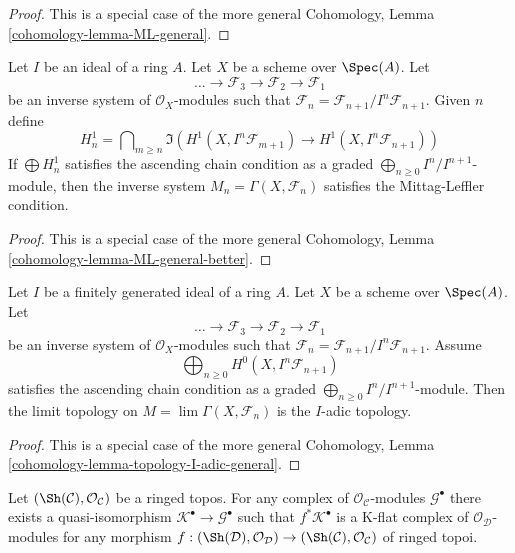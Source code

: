 \begin{proof}
This is a special case of the more general
Cohomology, Lemma \ref{cohomology-lemma-ML-general}.
\end{proof}

\begin{lemma}
\label{lemma-ML-general-better}
Let $I$ be an ideal of a ring $A$. Let $X$ be a scheme over $\Spec(A)$. Let
$$
\ldots \to \mathcal{F}_3 \to \mathcal{F}_2 \to \mathcal{F}_1
$$
be an inverse system of $\mathcal{O}_X$-modules
such that $\mathcal{F}_n = \mathcal{F}_{n + 1}/I^n\mathcal{F}_{n + 1}$.
Given $n$ define
$$
H^1_n =
\bigcap\nolimits_{m \geq n}
\Im\left(
H^1(X, I^n\mathcal{F}_{m + 1}) \to H^1(X, I^n\mathcal{F}_{n + 1})
\right)
$$
If $\bigoplus H^1_n$ satisfies the ascending chain condition as a graded
$\bigoplus_{n \geq 0} I^n/I^{n + 1}$-module, then the inverse system
$M_n = \Gamma(X, \mathcal{F}_n)$ satisfies the Mittag-Leffler condition.
\end{lemma}

\begin{proof}
This is a special case of the more general
Cohomology, Lemma \ref{cohomology-lemma-ML-general-better}.
\end{proof}

\begin{lemma}
\label{lemma-topology-I-adic-general}
Let $I$ be a finitely generated ideal of a ring $A$.
Let $X$ be a scheme over $\Spec(A)$. Let
$$
\ldots \to \mathcal{F}_3 \to \mathcal{F}_2 \to \mathcal{F}_1
$$
be an inverse system of $\mathcal{O}_X$-modules such that
$\mathcal{F}_n = \mathcal{F}_{n + 1}/I^n\mathcal{F}_{n + 1}$. Assume
$$
\bigoplus\nolimits_{n \geq 0} H^0(X, I^n\mathcal{F}_{n + 1})
$$
satisfies the ascending chain condition as a graded
$\bigoplus_{n \geq 0} I^n/I^{n + 1}$-module.
Then the limit topology on $M = \lim \Gamma(X, \mathcal{F}_n)$
is the $I$-adic topology.
\end{lemma}

\begin{proof}
This is a special case of the more general
Cohomology, Lemma \ref{cohomology-lemma-topology-I-adic-general}.
\end{proof}

\begin{lemma}
\label{lemma-pullback-K-flat}
Let $(\Sh(\mathcal{C}), \mathcal{O}_\mathcal{C})$ be a ringed topos.
For any complex of $\mathcal{O}_\mathcal{C}$-modules $\mathcal{G}^\bullet$
there exists a quasi-isomorphism $\mathcal{K}^\bullet \to \mathcal{G}^\bullet$
such that $f^*\mathcal{K}^\bullet$ is a K-flat complex of
$\mathcal{O}_\mathcal{D}$-modules for any morphism
$f : (\Sh(\mathcal{D}), \mathcal{O}_\mathcal{D}) \to
(\Sh(\mathcal{C}), \mathcal{O}_\mathcal{C})$ of ringed topoi.
\end{lemma}

